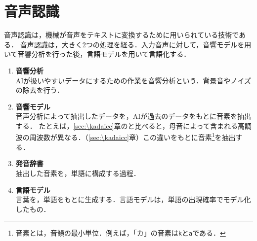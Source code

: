 \section{音声認識}
音声認識は，機械が音声をテキストに変換するために用いられている技術である．
音声認識は，大きく2つの処理を経る．入力音声に対して，音響モデルを用いて音響分析を行った後，言語モデルを用いて言語化する．
\begin{enumerate}
    \item \textbf{音響分析}\\
          AIが扱いやすいデータにするための作業を音響分析という．背景音やノイズの除去を行う．
    \item \textbf{音響モデル}\\
          音声分析によって抽出したデータを，AIが過去のデータをもとに音素を抽出する．
          たとえば，\ref{sec:\kadaicc}章のと比べると，母音によって含まれる高調波の周波数が異なる．（\ref{sec:\kadaicc}章）この違いをもとに音素\footnote{音素とは，音韻の最小単位．例えば，「カ」の音素は\texttt{k}と\texttt{a}である．}を抽出する．
    \item \textbf{発音辞書}\\
          抽出した音素を，単語に構成する過程．
    \item \textbf{言語モデル}\\
          言葉を，単語をもとに生成する．言語モデルは，単語の出現確率でモデル化したもの．
\end{enumerate}